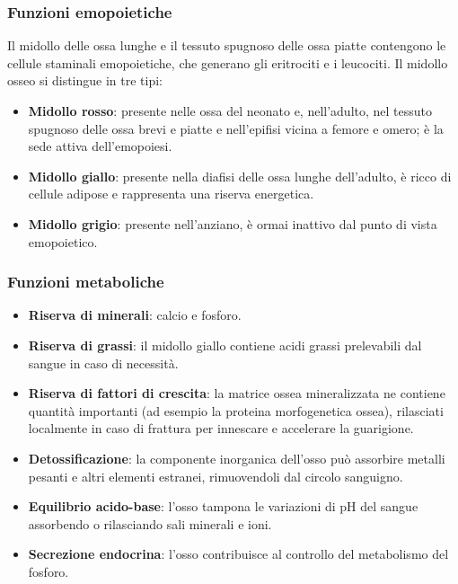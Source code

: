 \subsubsection{Funzioni emopoietiche}

Il midollo delle ossa lunghe e il tessuto spugnoso delle ossa piatte
contengono le cellule staminali emopoietiche, che generano gli eritrociti e i
leucociti. Il midollo osseo si distingue in tre tipi:

\begin{itemize}
  \item \textbf{Midollo rosso}: presente nelle ossa del neonato e, nell'adulto,
    nel tessuto spugnoso delle ossa brevi e piatte e nell'epifisi vicina a
    femore e omero; è la sede attiva dell'emopoiesi.
  \item \textbf{Midollo giallo}: presente nella diafisi delle ossa lunghe
    dell'adulto, è ricco di cellule adipose e rappresenta una riserva
    energetica.
  \item \textbf{Midollo grigio}: presente nell'anziano, è ormai inattivo dal
    punto di vista emopoietico.
\end{itemize}

\subsubsection{Funzioni metaboliche}

\begin{itemize}
  \item \textbf{Riserva di minerali}: calcio e fosforo.
  \item \textbf{Riserva di grassi}: il midollo giallo contiene acidi grassi
    prelevabili dal sangue in caso di necessità.
  \item \textbf{Riserva di fattori di crescita}: la matrice ossea mineralizzata
    ne contiene quantità importanti (ad esempio la proteina morfogenetica
    ossea), rilasciati localmente in caso di frattura per innescare e
    accelerare la guarigione.
  \item \textbf{Detossificazione}: la componente inorganica dell'osso può
    assorbire metalli pesanti e altri elementi estranei, rimuovendoli dal
    circolo sanguigno.
  \item \textbf{Equilibrio acido-base}: l'osso tampona le variazioni di pH del
    sangue assorbendo o rilasciando sali minerali e ioni.
  \item \textbf{Secrezione endocrina}: l'osso contribuisce al controllo del
    metabolismo del fosforo.
\end{itemize}

